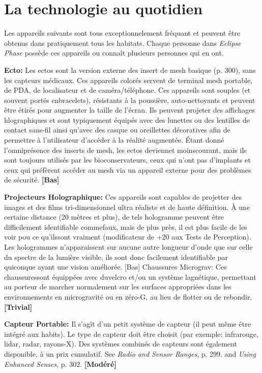 \section{La technologie au quotidien} \label{sec:everyday-tech} 

Les appareils suivants sont tous exceptionnelement fréquant et peuvent être obtenus dans pratiquement tous les habitats. Chaque personne dans \emph{Eclipse Phase} possède ces appareils ou connaît plusieurs personnes qui en ont. 

\textbf{Ecto:} Les ectos sont la version externe des insert de mesh basique  (p. 300), sans les capteurs médicaux. Ces appareils colorés servent de terminal mesh portable, de PDA, de localisateur et de caméra/téléphone. Ces appareils sont souples (et souvent portés enbracelets), résistants à la poussière, auto-nettoyants et peuvent être étirés pour augmenter la taille de l'écran. Ils peuvent projeter des affichages hlographiques et sont typiquement équipés avec des lunettes ou des lentilles de contact sans-fil ainsi qu'avec des casque ou oreillettes décoratives afin de permettre à l'utilisateur d'accéder à la réalité augmentée. Étant donné l'omniprésence des inserts de mesh, les ectos deviennet moinscourant, mais ils sont toujours utilisés par les bioconservateurs, ceux qui n'ont pas d'implants et ceux qui préfèrent accéder au mesh via un appareil externe pour des problèmes de sécurité. \textbf{[Bas]} 

\textbf{Projecteurs Holographique:} Ces appareils sont capables de projetter des images et des films tri-dimensionnel ultra réaliste et de haute définition. À une certaine distance (20 mètres et plus), de tels hologramme peuvent être difficilement identifiable commefaux, mais de plus près, il est plus facile de les voir pou ce qu'ilssont vraiment (modificateur de +20 aux Tests de Perception). Les hologrammes n'apparaissent sur aucune autre longueur d'onde que sur celle du spectre de la lumière visible, ils sont donc facilement identifiable par quiconque ayant une vision améliorée. [Bas] Chaussures Micrograv: Ces chaussuressont équippées avec duvelcro et/ou un système lagnétique, permettant au porteur de marcher normalement sur les surfaces appropriées dans les environnements en microgravité ou en zéro-G, au lieu de flotter ou de rebondir. \textbf{[Trivial]} 

\textbf{Capteur Portable:} Il s'agît d'un petit système de capteur (il peut même être intégré aux habits). Le type de capteur doit être choisit (par exemple: infrarouge, lidar, radar, rayons-X). Des systèmes combinés de capteurs sont également disponible, à un prix cumulatif. See \emph{Radio and Sensor Ranges}, p. 299. and \emph{Using Enhanced Senses}, p. 302. \textbf{[Modéré]} 

